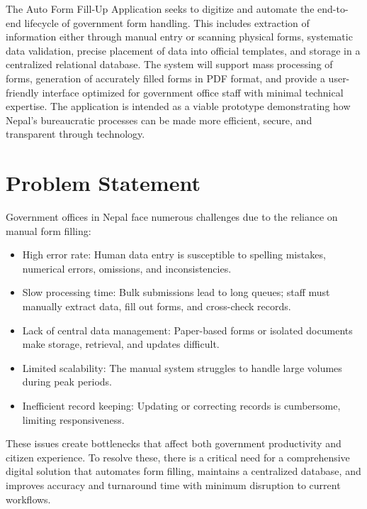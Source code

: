 \documentclass[12pt,a4paper]{report}
\begin{document}
The Auto Form Fill-Up Application seeks to digitize and automate the end-to-end lifecycle of government form handling. This includes extraction of information either through manual entry or scanning physical forms, systematic data validation, precise placement of data into official templates, and storage in a centralized relational database. The system will support mass processing of forms, generation of accurately filled forms in PDF format, and provide a user-friendly interface optimized for government office staff with minimal technical expertise. The application is intended as a viable prototype demonstrating how Nepal’s bureaucratic processes can be made more efficient, secure, and transparent through technology.

\chapter{Problem Statement}
Government offices in Nepal face numerous challenges due to the reliance on manual form filling:
\begin{itemize}
    \item High error rate: Human data entry is susceptible to spelling mistakes, numerical errors, omissions, and inconsistencies.
    \item Slow processing time: Bulk submissions lead to long queues; staff must manually extract data, fill out forms, and cross-check records.
    \item Lack of central data management: Paper-based forms or isolated documents make storage, retrieval, and updates difficult.
    \item Limited scalability: The manual system struggles to handle large volumes during peak periods.
    \item Inefficient record keeping: Updating or correcting records is cumbersome, limiting responsiveness.
\end{itemize}
These issues create bottlenecks that affect both government productivity and citizen experience. To resolve these, there is a critical need for a comprehensive digital solution that automates form filling, maintains a centralized database, and improves accuracy and turnaround time with minimum disruption to current workflows.
\end{document}
